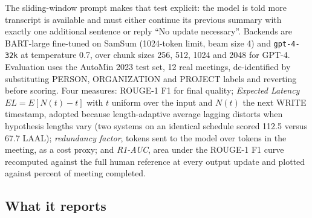 \begin{center}
\end{center}

The sliding-window prompt makes that test explicit: the model is told more transcript is available and must either continue its previous summary with exactly one additional sentence or reply ``No update necessary''. Backends are BART-large fine-tuned on SamSum (1024-token limit, beam size 4) and \texttt{gpt-4-32k} at temperature 0.7, over chunk sizes 256, 512, 1024 and 2048 for GPT-4. Evaluation uses the AutoMin 2023 test set, 12 real meetings, de-identified by substituting PERSON, ORGANIZATION and PROJECT labels and reverting before scoring. Four measures: ROUGE-1 F1 for final quality; \emph{Expected Latency} $EL=E[N(t)-t]$ with $t$ uniform over the input and $N(t)$ the next WRITE timestamp, adopted because length-adaptive average lagging distorts when hypothesis lengths vary (two systems on an identical schedule scored 112.5 versus 67.7 LAAL); \emph{redundancy factor}, tokens sent to the model over tokens in the meeting, as a cost proxy; and \emph{R1-AUC}, area under the ROUGE-1 F1 curve recomputed against the full human reference at every output update and plotted against percent of meeting completed.

\subsection{What it reports}

